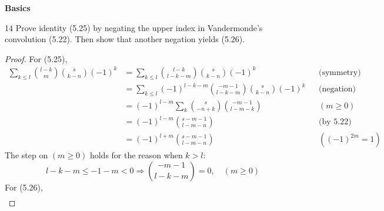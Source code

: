 \documentclass[a4paper,12pt]{article}
\theoremstyle{definition}
\newenvironment{problems}{\begin{list}{}{\renewcommand{\makelabel}[1]{\textbf{##1}\hfil}}}{\end{list}}
\begin{document}
\noindent\textbf{Basics}

\begin{problems}
   \item[14]Prove identity (5.25) by negating the upper index in Vandermonde's convolution (5.22).  Then show that another negation yields (5.26).
   \begin{proof}
        For (5.25),
        \begin{align*}
            \sum_{k\leq l} \binom{l-k}{m}\binom{s}{k-n}(-1)^k  &= \sum_{k\leq l} \binom{l-k}{l-k-m}\binom{s}{k-n}(-1)^k &&\text{(symmetry)}\\
            &= \sum_{k\leq l} (-1)^{l-k-m}\binom{-m-1}{l-k-m}\binom{s}{k-n}(-1)^k && \text{(negation)} \\
            &= (-1)^{l-m}\sum_{k} \binom{s}{-n+k}\binom{-m-1}{l-m-k} && (m\geq 0) \\
            &= (-1)^{l-m} \binom{s-m-1}{l-m-n} && \text{(by 5.22)} \\
            &= (-1)^{l+m} \binom{s-m-1}{l-m-n} && ((-1)^{2m} = 1) 
        \end{align*}
        The step on $(m\geq 0)$ holds for the reason when $k>l$:
        \begin{equation}\label{eq:m}
            l-k-m \leq -1-m<0 \Rightarrow \binom{-m-1}{l-k-m} = 0,\quad (m\geq 0)
        \end{equation}
        For (5.26),
        \begin{align*}

\end{align*}
\end{proof}
\end{problems}
\end{document}
